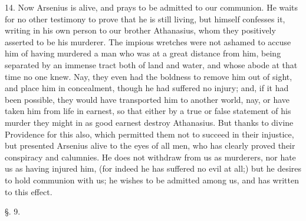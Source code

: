 14. Now Arsenius is alive, and prays to be
admitted to our communion. He waits for no other testimony to prove
that he is still living, but himself confesses it, writing in his own
person to our brother Athanasius, whom they positively asserted
to be his murderer. The impious wretches were not ashamed to accuse
him of having murdered a man who was at a great distance from him,
being separated by an immense tract both of land and water, and whose
abode at that time no one knew. Nay, they even had the boldness to
remove him out of sight, and place him in concealment, though he had
suffered no injury; and, if it had been possible, they would have
transported him to another world, nay, or have taken him from life in
earnest, so that either by a true or false statement of his murder
they might in as good earnest destroy Athanasius. But thanks to divine
Providence for this also, which permitted them not to succeed in their
injustice, but presented Arsenius alive to the eyes of all men, who
has clearly proved their conspiracy and calumnies. He does not
withdraw from us as murderers, nor hate us as having injured him, (for
indeed he has suffered no evil at all;) but he desires to hold
communion with us; he wishes to be admitted among us, and has written
to this effect.

§. 9.

